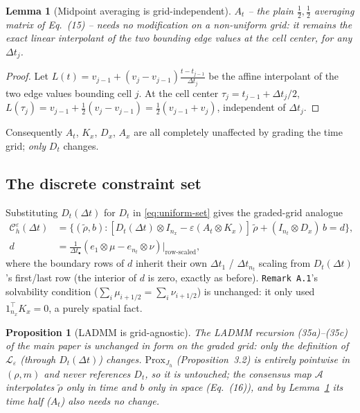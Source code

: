 \documentclass[11pt]{article}
\newtheorem{proposition}{Proposition}
\newtheorem{lemma}{Lemma}
\newcommand{\eps}{\varepsilon}
\newcommand{\dt}{\Delta t}
\newcommand{\Ch}{\mathcal{C}^\eps_h}
\newcommand{\code}[1]{\texttt{#1}}
\begin{document}
\begin{lemma}[Midpoint averaging is grid-independent]
\label{lem:At}
$A_t$ -- the plain $\tfrac12,\tfrac12$ averaging matrix of Eq.~(15) -- needs \emph{no}
modification on a non-uniform grid: it remains the exact linear interpolant of the two bounding
edge values at the cell center, for \emph{any} $\dt_j$.
\end{lemma}
\begin{proof}
Let $L(t) = v_{j-1} + (v_j-v_{j-1})\frac{t-t_{j-1}}{\dt_j}$ be the affine interpolant of the two
edge values bounding cell $j$. At the cell center $\tau_j = t_{j-1}+\dt_j/2$,
$L(\tau_j) = v_{j-1} + \tfrac12(v_j-v_{j-1}) = \tfrac12(v_{j-1}+v_j)$, independent of $\dt_j$.
\end{proof}

Consequently $A_t$, $K_x$, $D_x$, $A_x$ are all completely unaffected by grading the time grid;
\emph{only} $D_t$ changes.

\subsection{The discrete constraint set}

Substituting $D_t(\dt)$ for $D_t$ in \eqref{eq:uniform-set} gives the graded-grid analogue
\begin{equation}
\begin{split}
  \Ch(\dt) &= \bigl\{(\tilde\rho,b) : [D_t(\dt)\otimes I_{n_x} - \eps(A_t\otimes K_x)]\,\tilde\rho +
        (I_{n_t}\otimes D_x)\,b = d \bigr\}, \\
  d &= \tfrac1{\dt_\bullet}(e_1\otimes\mu - e_{n_t}\otimes\nu) \big|_{\text{row-scaled}},
\end{split}
\end{equation}
where the boundary rows of $d$ inherit their own $\dt_1$ / $\dt_{n_t}$ scaling from $D_t(\dt)$'s
first/last row (the interior of $d$ is zero, exactly as before). \code{Remark A.1}'s solvability
condition ($\sum_i\mu_{i+1/2}=\sum_i\nu_{i+1/2}$) is unchanged: it only used $1_{n_x}^\top K_x=0$,
a purely spatial fact.

\begin{proposition}[LADMM is grid-agnostic]
The LADMM recursion \emph{(35a)--(35c)} of the main paper is unchanged in form on the graded
grid: only the definition of $\mathcal{L}_\eps$ (through $D_t(\dt)$) changes. $\mathrm{Prox}_{J_h}$
(Proposition~3.2) is entirely pointwise in $(\rho,m)$ and never references $D_t$, so it is
untouched; the consensus map $\mathcal{A}$ interpolates $\tilde\rho$ only in time and $b$ only in
space (Eq.~(16)), and by Lemma~\ref{lem:At} its time half ($A_t$) also needs no change.
\end{proposition}
\end{document}
